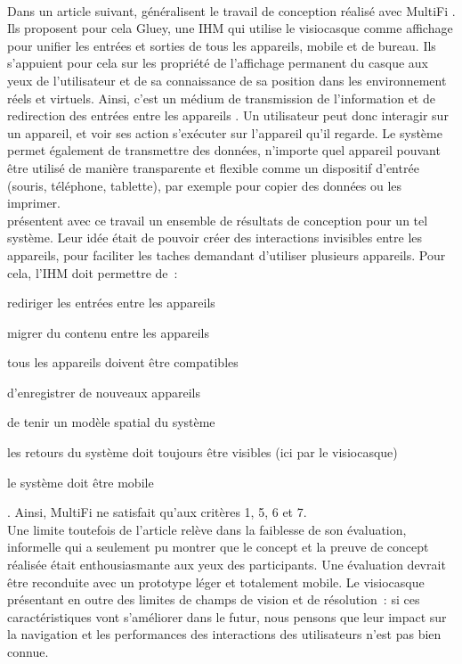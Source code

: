 \paragraph*{}
Dans un article suivant, \cite{SerranoEnsYangEtAl2015} généralisent le travail de conception réalisé avec MultiFi \citep{GrubertHeinischQuigleyEtAl2015}. Ils proposent pour cela Gluey, une IHM qui utilise le visiocasque comme affichage pour unifier les entrées et sorties de tous les appareils, mobile et de bureau. Ils s'appuient pour cela sur les propriété de l'affichage permanent du casque aux yeux de l'utilisateur et de sa connaissance de sa position dans les environnement réels et virtuels. Ainsi, c'est un médium de transmission de l'information et de redirection des entrées entre les appareils .
Un utilisateur peut donc interagir sur un appareil, et voir ses action s'exécuter sur l'appareil qu'il regarde. Le système permet également de transmettre des données, n'importe quel appareil pouvant être utilisé de manière transparente et flexible comme un dispositif d'entrée (souris, téléphone, tablette), par exemple pour copier des données ou les imprimer.\\
\citeauthor{SerranoEnsYangEtAl2015} présentent avec ce travail un ensemble de résultats de conception pour un tel système. Leur idée était de pouvoir créer des interactions invisibles entre les appareils, pour faciliter les taches demandant d'utiliser plusieurs appareils. Pour cela, l'IHM doit permettre de~: 
\begin{enumerate*}
	\item rediriger les entrées entre les appareils
	\item migrer du contenu entre les appareils
	\item tous les appareils doivent être compatibles
	\item d'enregistrer de nouveaux appareils
	\item de tenir un modèle spatial du système
	\item les retours du système doit toujours être visibles (ici par le visiocasque)
	\item le système doit être mobile
\end{enumerate*}. Ainsi, MultiFi \citep{GrubertHeinischQuigleyEtAl2015} ne satisfait qu'aux critères 1, 5, 6 et 7.\\
Une limite toutefois de l'article relève dans la faiblesse de son évaluation, informelle qui a seulement pu montrer que le concept et la preuve de concept réalisée était enthousiasmante aux yeux des participants. Une évaluation devrait être reconduite avec un prototype léger et totalement mobile. Le visiocasque présentant en outre des limites de champs de vision et de résolution~: si ces caractéristiques vont s'améliorer dans le futur, nous pensons que leur impact sur la navigation et les performances des interactions des utilisateurs n'est pas bien connue.

